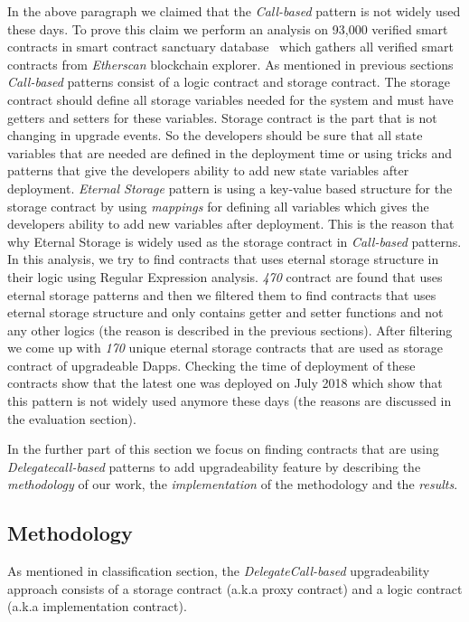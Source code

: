 In the above paragraph we claimed that the \textit{Call-based} pattern is not widely used these days. To prove this claim we perform an analysis on 93,000 verified smart contracts in smart contract sanctuary database~\cite{smart_contract_sanctuary} which gathers all verified smart contracts from \textit{Etherscan} blockchain explorer. As mentioned in previous sections \textit{Call-based} patterns consist of a logic contract and storage contract. The storage contract should define all storage variables needed for the system and must have getters and setters for these variables. Storage contract is the part that is not changing in upgrade events. So the developers should be sure that all state variables that are needed are defined in the deployment time or using tricks and patterns that give the developers ability to add new state variables after deployment. \textit{Eternal Storage} pattern is using a key-value based structure for the storage contract by using \textit{mappings} for defining all variables which gives the developers ability to add new variables after deployment. This is the reason that why Eternal Storage is widely used as the storage contract in \textit{Call-based} patterns. In this analysis, we try to find contracts that uses eternal storage structure in their logic using Regular Expression analysis. \emph{470} contract are found that uses eternal storage patterns and then we filtered them to find contracts that uses eternal storage structure and only contains getter and setter functions and not any other logics (the reason is described in the previous sections). After filtering we come up with \emph{170} unique eternal storage contracts that are used as storage contract of upgradeable Dapps. Checking the time of deployment of these contracts show that the latest one was deployed on July 2018 which show that this pattern is not widely used anymore these days (the reasons are discussed in the evaluation section).

In the further part of this section we focus on finding contracts that are using \textit{Delegatecall-based} patterns to add upgradeability feature by describing the \textit{methodology} of our work, the \textit{implementation} of the methodology and the \textit{results}.  

\subsection{Methodology}
As mentioned in classification section, the \textit{DelegateCall-based} upgradeability approach consists of a storage contract (a.k.a proxy contract) and a logic contract (a.k.a implementation contract). 

